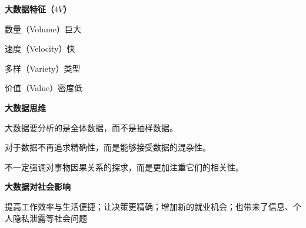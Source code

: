 \begin{compactenum}[1.]
\item \textbf{大数据特征（$4V$）}
	\begin{compactitem}
	\item  数量（Volume）巨大
	\item  速度（Velocity）快
	\item  多样（Variety）类型
	\item  价值（Value）密度低
	\end{compactitem}

\item \textbf{大数据思维}
	\begin{compactitem}
	\item  大数据要分析的是全体数据，而不是抽样数据。
	\item  对于数据不再追求精确性，而是能够接受数据的混杂性。
	\item  不一定强调对事物因果关系的探求，而是更加注重它们的相关性。
	\end{compactitem}

\item \textbf{大数据对社会影响}
	\begin{compactitem}
	\item  提高工作效率与生活便捷；让决策更精确；增加新的就业机会；也带来了信息、个人隐私泄露等社会问题
	\end{compactitem}

\end{compactenum}%


